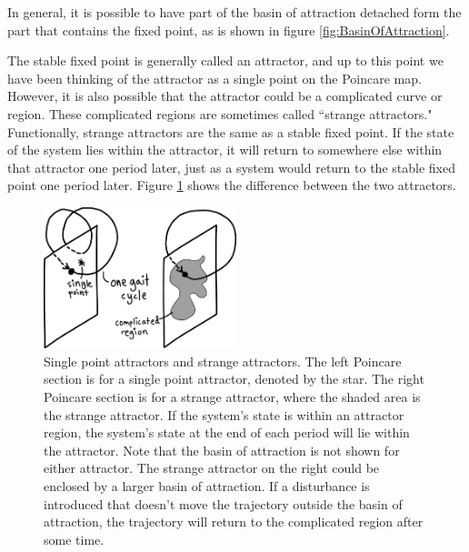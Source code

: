 
In general, it is possible to have part of the basin of attraction detached
form the part that contains the fixed point, as is shown in figure
\ref{fig:BasinOfAttraction}.

The stable fixed point is generally called an attractor, and up to this point
we have been thinking of the attractor as a single point on the Poincare map.
However, it is also possible that the attractor could be a complicated curve or
region. These complicated regions are sometimes called ``strange attractors."
Functionally, strange attractors are the same as a stable fixed point. If the
state of the system lies within the attractor, it will return to somewhere else
within that attractor one period later, just as a system would return to the
stable fixed point one period later. Figure \ref{fig:Attractors} shows the
difference between the two attractors.

\begin{figure}[h]		%
\begin{centering}
\includegraphics[width=0.5\textwidth]{Figures/Attractors}\par
\end{centering}
\caption[Diagram: Single Point Attractors and Strange Attractors]{Single point
attractors and strange attractors. The left Poincare section is for a single
point attractor, denoted by the star. The right Poincare section is for a
strange attractor, where the shaded area is the strange attractor. If the
system's state is within an attractor region, the system's state at the end of
each period will lie within the attractor. Note that the basin of attraction is
not shown for either attractor. The strange attractor on the right could be
enclosed by a larger basin of attraction. If a disturbance is introduced that
doesn't move the trajectory outside the basin of attraction, the trajectory
will return to the complicated region after some time.}
\label{fig:Attractors}
\end{figure}
%

